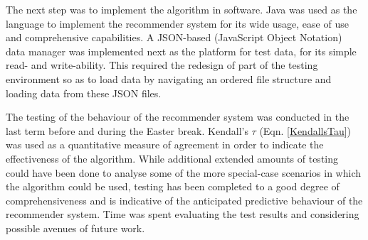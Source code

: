 The next step was to implement the algorithm in software. Java was used as the language to implement the recommender system for its wide usage, ease of use and comprehensive capabilities. A JSON-based (JavaScript Object Notation) data manager was implemented next as the platform for test data, for its simple read- and write-ability. This required the redesign of part of the testing environment so as to load data by navigating an ordered file structure and loading data from these JSON files.

The testing of the behaviour of the recommender system was conducted in the last term before and during the Easter break. Kendall's $\tau$ (Eqn. \ref{KendallsTau}) was used as a quantitative measure of agreement in order to indicate the effectiveness of the algorithm. While additional extended amounts of testing could have been done to analyse some of the more special-case scenarios in which the algorithm could be used, testing has been completed to a good degree of comprehensiveness and is indicative of the anticipated predictive behaviour of the recommender system. Time was spent evaluating the test results and considering possible avenues of future work. 
